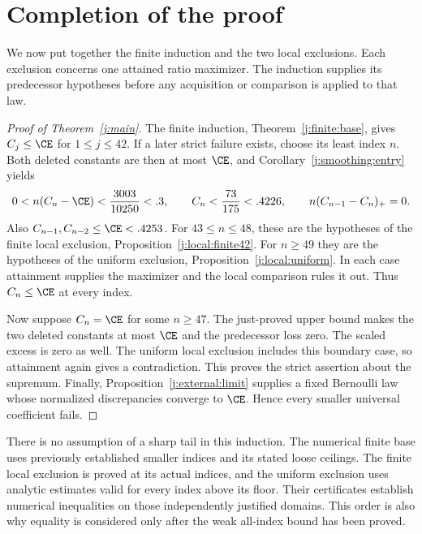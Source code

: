 \section{Completion of the proof}\label{j:composition}

We now put together the finite induction and the two local exclusions.
Each exclusion concerns one attained ratio maximizer. The induction
supplies its predecessor hypotheses before any acquisition or comparison
is applied to that law.

\begin{proof}[Proof of Theorem~\ref{j:main}]
The finite induction, Theorem~\ref{j:finite:base}, gives
$C_j\le\CE$ for $1\le j\le42$. If a later strict failure exists,
choose its least index $n$. Both deleted constants are then at most
$\CE$, and Corollary~\ref{j:smoothing:entry} yields
\[
 0<n(C_n-\CE)<\frac{3003}{10250}<.3,\qquad
 C_n<\frac{73}{175}<.4226,\qquad
 n(C_{n-1}-C_n)_+=0.
\]
Also $C_{n-1},C_{n-2}\le\CE<.4253$. For $43\le n\le48$,
these are the hypotheses of the finite local exclusion,
Proposition~\ref{j:local:finite42}. For $n\ge49$ they are the
hypotheses of the uniform exclusion, Proposition~\ref{j:local:uniform}.
In each case attainment supplies the maximizer and the local comparison
rules it out. Thus $C_n\le\CE$ at every index.

Now suppose $C_n=\CE$ for some $n\ge47$. The just-proved upper bound
makes the two deleted constants at most $\CE$ and the predecessor
loss zero. The scaled excess is zero as well. The uniform local
exclusion includes this boundary case, so attainment again gives a
contradiction. This proves the strict assertion about the supremum.
Finally, Proposition~\ref{j:external:limit} supplies a fixed Bernoulli
law whose normalized discrepancies converge to $\CE$. Hence every
smaller universal coefficient fails.
\end{proof}

There is no assumption of a sharp tail in this induction. The numerical
finite base uses previously established smaller indices and its stated
loose ceilings. The finite local exclusion is proved at its actual
indices, and the uniform exclusion uses analytic estimates valid for
every index above its floor. Their certificates establish numerical
inequalities on those independently justified domains. This order is
also why equality is considered only after the weak all-index bound
has been proved.
